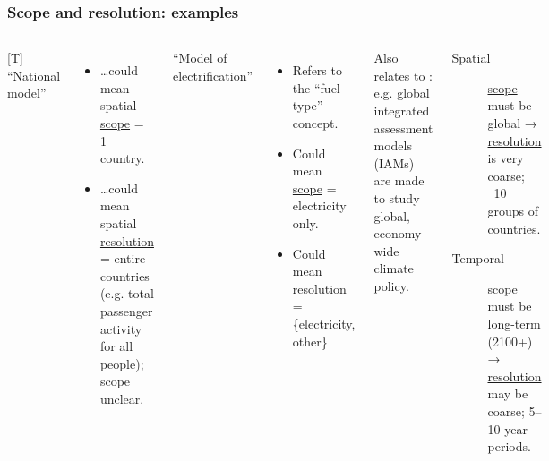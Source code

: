 \documentclass[12pt,aspectratio=169]{beamer}
\begin{document}
\begin{frame}
\frametitle{Scope and resolution: examples}

\begin{columns}
[T]
“National model”
\begin{itemize}
  \item …could mean spatial \uline{scope} = 1 country.
  \item …could mean spatial \uline{resolution} = entire countries (e.g. total passenger activity for all people); scope unclear.
\end{itemize}

\bigskip
“Model of electrification”
\begin{itemize}
  \item Refers to the “fuel type” concept.
  \item Could mean \uline{scope} = electricity only.
  \item Could mean \uline{resolution} = \{electricity, other\}
\end{itemize}

Also relates to : e.g. global integrated assessment models (IAMs) are made to study global, economy-wide climate policy.
\begin{description}
  \item [Spatial] \uline{scope} must be global → \uline{resolution} is very coarse; ~10 groups of countries.
  \item [Temporal] \uline{scope} must be long-term (2100+) → \uline{resolution} may be coarse; 5–10 year periods.
\end{description}
\end{columns}

\end{frame}
\end{document}
